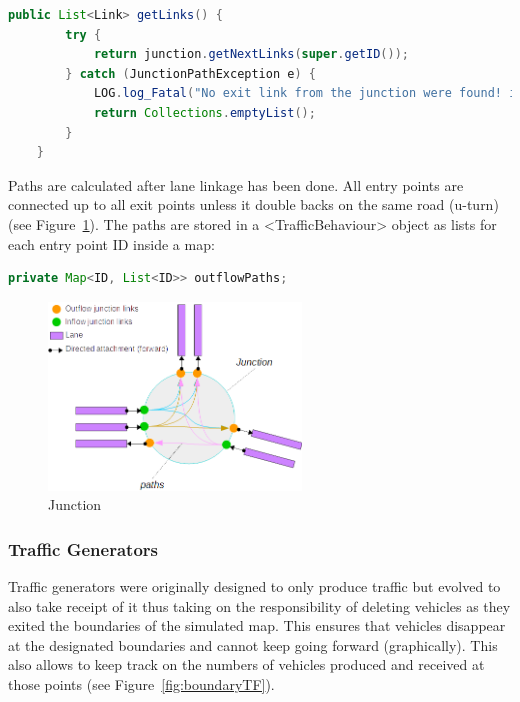 \begin{lstlisting}[language=Java]
    public List<Link> getLinks() {
        try {
            return junction.getNextLinks(super.getID());
        } catch (JunctionPathException e) {
            LOG.log_Fatal("No exit link from the junction were found! i.e.: Car is stuck!");
            return Collections.emptyList();
        }
    }
\end{lstlisting}

Paths are calculated after lane linkage has been done. All entry points are connected up to all exit points unless it double backs on the same road (u-turn) (see Figure~\ref{fig:junction}). The paths are stored in a <TrafficBehaviour> object as lists for each entry point ID inside a map:

\begin{lstlisting}[language=Java]
	private Map<ID, List<ID>> outflowPaths;
\end{lstlisting}

\begin{figure}[!h]
	\vspace{1.5em}
  	\caption{Junction}
  	\label{fig:junction}
  	\centering
	\includegraphics[width=0.6\textwidth]{figs/graphConstruction/Junction.png}
  	\vspace{1.5em}
\end{figure}

\subsubsection{Traffic Generators}

Traffic generators were originally designed to only produce traffic but evolved to also take receipt of it thus taking on the responsibility of deleting vehicles as they exited the boundaries of the simulated map. This ensures that vehicles disappear at the designated boundaries and cannot keep going forward (graphically). This also allows to keep track on the numbers of vehicles produced and received at those points (see Figure~\ref{fig:boundaryTF}).

